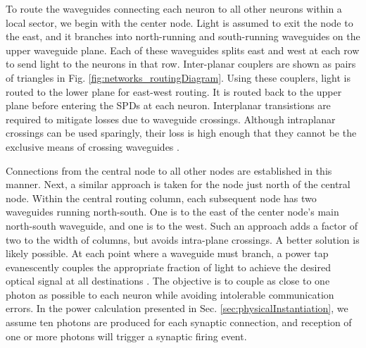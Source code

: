 \documentclass[twocolumn]{article}
\begin{document}
To route the waveguides connecting each neuron to all other neurons within a local sector, we begin with the center node. Light is assumed to exit the node to the east, and it branches into north-running and south-running waveguides on the upper waveguide plane. Each of these waveguides splits east and west at each row to send light to the neurons in that row. Inter-planar couplers \cite{chbu2017} are shown as pairs of triangles in Fig. \ref{fig:networks_routingDiagram}. Using these couplers, light is routed to the lower plane for east-west routing. It is routed back to the upper plane before entering the SPDs at each neuron. Interplanar transistions are required to mitigate losses due to waveguide crossings. Although intraplanar crossings can be used sparingly, their loss is high enough that they cannot be the exclusive means of crossing waveguides \cite{lish2014}. 

Connections from the central node to all other nodes are established in this manner. Next, a similar approach is taken for the node just north of the central node. Within the central routing column, each subsequent node has two waveguides running north-south. One is to the east of the center node's main north-south waveguide, and one is to the west. Such an approach adds a factor of two to the width of columns, but avoids intra-plane crossings. A better solution is likely possible. At each point where a waveguide must branch, a power tap evanescently couples the appropriate fraction of light to achieve the desired optical signal at all destinations \cite{chbu2018}. The objective is to couple as close to one photon as possible to each neuron while avoiding intolerable communication errors. In the power calculation presented in Sec. \ref{sec:physicalInstantiation}, we assume ten photons are produced for each synaptic connection, and reception of one or more photons will trigger a synaptic firing event. 
\end{document}
